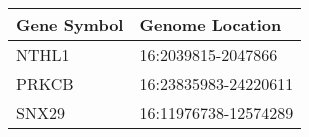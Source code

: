 \begin{tabular}{ll}
\toprule
Gene Symbol &      Genome Location \\
\midrule
      NTHL1 &   16:2039815-2047866 \\
      PRKCB & 16:23835983-24220611 \\
      SNX29 & 16:11976738-12574289 \\
\bottomrule
\end{tabular}
